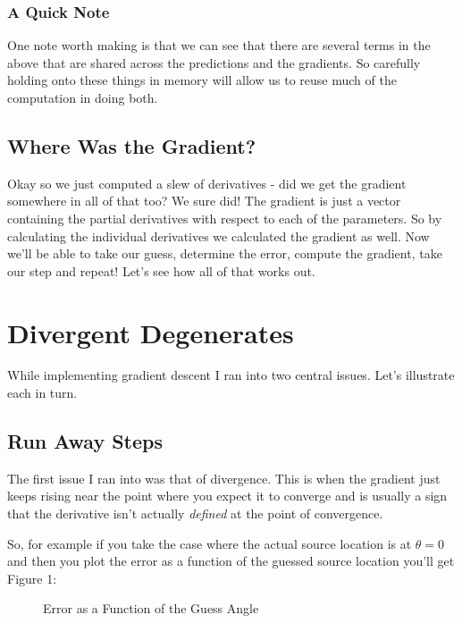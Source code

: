 \documentclass[10pt,a5paper]{book}
\begin{document}
\subsection{A Quick Note}
One note worth making is that we can see that there are several terms in the above that are shared across the predictions and the gradients. So carefully holding onto these things in memory will allow us to reuse much of the computation in doing both.

\section{Where Was the Gradient?}
Okay so we just computed a slew of derivatives - did we get the gradient somewhere in all of that too? We sure did! The gradient is just a vector containing the partial derivatives with respect to each of the parameters. So by calculating the individual derivatives we calculated the gradient as well. Now we'll be able to take our guess, determine the error, compute the gradient, take our step and repeat! Let's see how all of that works out.

\newpage



\chapter{Divergent Degenerates}
While implementing gradient descent I ran into two central issues. Let's illustrate each in turn.

\section{Run Away Steps}
The first issue I ran into was that of divergence. This is when the gradient just keeps rising near the point where you expect it to converge and is usually a sign that the derivative isn't actually \textit{defined} at the point of convergence. 

So, for example if you take the case where the actual source location is at $\theta=0$ and then you plot the error as a function of the guessed source location you'll get Figure 1:

\begin{figure}[!htb]
\caption{\label{fig:my-label} Error as a Function of the Guess Angle}
\end{figure}
\end{document}
